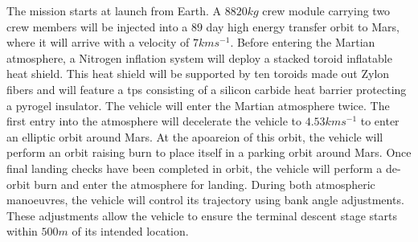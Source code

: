 The mission starts at launch from Earth. A $8820 kg$ crew module carrying two crew members will be injected into a $89$ day high energy transfer orbit to Mars, where it will arrive with a velocity of $7 kms^{-1}$. Before entering the Martian atmosphere, a Nitrogen inflation system will deploy a stacked toroid inflatable heat shield. This heat shield will be supported by ten toroids made out Zylon fibers and will feature a \gls{tps} consisting of a silicon carbide heat barrier protecting a pyrogel insulator. The vehicle will enter the Martian atmosphere twice. The first entry into the atmosphere will decelerate the vehicle to $4.53 kms^{-1}$ to enter an elliptic orbit around Mars. At the apoareion of this orbit, the vehicle will perform an orbit raising burn to place itself in a parking orbit around Mars. Once final landing checks have been completed in orbit, the vehicle will perform a de-orbit burn and enter the atmosphere for landing. During both atmospheric manoeuvres, the vehicle will control its trajectory using bank angle adjustments. These adjustments allow the vehicle to ensure the terminal descent stage starts within $500m$ of its intended location.  
